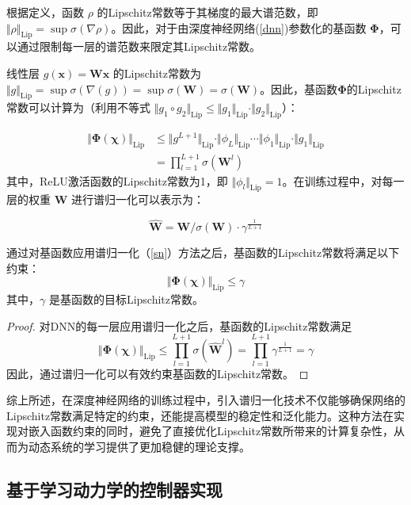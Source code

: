 \documentclass[lang=chs, degree=master, blindreview=false, winfonts=true]{yanputhesis}
\begin{document}
根据定义，函数 $\rho$ 的Lipschitz常数等于其梯度的最大谱范数，即 $\Vert \rho \Vert_{\text{Lip}} = \sup \sigma (\nabla \rho)$。因此，对于由深度神经网络(\ref{dnn})参数化的基函数 $\bm{\Phi}$，可以通过限制每一层的谱范数来限定其Lipschitz常数。

线性层 $g(\bm{x})=\bm{W}\bm{x}$ 的Lipschitz常数为 $\Vert g \Vert_{\text{Lip}} = \sup \sigma(\nabla(g))=\sup \sigma(\bm{W})=\sigma(\bm{W})$。因此，基函数$\bm{\Phi}$的Lipschitz常数可以计算为（利用不等式 $\Vert g_1 \circ g_2 \Vert_{\text{Lip}} \le \Vert g_1 \Vert_{\text{Lip}}\cdot \Vert g_2 \Vert_{\text{Lip}}$）：

\[
\begin{aligned}
	\Vert \bm{\Phi}(\bm{\chi}) \Vert_{\text{Lip}} &\le \Vert g^{L+1} \Vert_{\text{Lip}} \cdot \Vert \phi_L \Vert_{\text{Lip}} \cdots \Vert \phi_1 \Vert_{\text{Lip}} \cdot \Vert g_1 \Vert_{\text{Lip}} \\
	&= \prod_{l=1}^{L+1}\sigma(\bm{W}^l)
\end{aligned}
\]
其中，ReLU激活函数的Lipschitz常数为1，即 $\Vert \phi_l \Vert_{\text{Lip}} = 1$。在训练过程中，对每一层的权重 $\bm{W}$ 进行谱归一化可以表示为：

\[
\hat{\bm{W}} = \bm{W} / \sigma(\bm{W}) \cdot \gamma ^{\frac{1}{L+1}}  \label{sn}
\]


\begin{lemma} \label{lemma_lip}
	通过对基函数应用谱归一化（\ref{sn}）方法之后，基函数的Lipschitz常数将满足以下约束：
	\[
	\Vert \bm{\Phi}(\bm{\chi}) \Vert_{\text{Lip}}\le \gamma
	\]
	其中，$\gamma$ 是基函数的目标Lipschitz常数。
\end{lemma}

\begin{proof}
	对DNN的每一层应用谱归一化之后，基函数的Lipschitz常数满足
	\[
	\Vert \bm{\Phi}(\bm{\chi}) \Vert_{\text{Lip}} \le \prod_{l=1}^{L+1}\sigma(\hat{\bm{W}}^l) = \prod_{l=1}^{L+1}\gamma^{\frac{1}{L+1}}=\gamma
	\]
	因此，通过谱归一化可以有效约束基函数的Lipschitz常数。
\end{proof}

综上所述，在深度神经网络的训练过程中，引入谱归一化技术不仅能够确保网络的Lipschitz常数满足特定的约束，还能提高模型的稳定性和泛化能力。这种方法在实现对嵌入函数约束的同时，避免了直接优化Lipschitz常数所带来的计算复杂性，从而为动态系统的学习提供了更加稳健的理论支撑。


\subsection{基于学习动力学的控制器实现}
\end{document}

